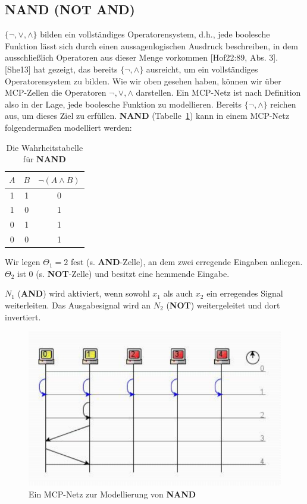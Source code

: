 {\subsection*{NAND (NOT AND)}

$\{\neg, \lor, \land\}$ bilden ein vollständiges Operatorensystem, d.h., jede boolesche Funktion lässt sich durch einen aussagenlogischen Ausdruck  beschreiben, in dem ausschließlich Operatoren aus dieser Menge vorkommen [Hof22:89, Abs. 3].
[She13] hat gezeigt, das bereits $\{\neg, \land\}$  ausreicht, um ein vollständiges Operatorensystem zu bilden.
Wie wir oben gesehen haben, können wir über MCP-Zellen die Operatoren $\neg, \lor, \land$ darstellen.
Ein MCP-Netz ist nach Definition also in der Lage, jede boolesche Funktion zu modellieren.
Bereits $\{\neg, \land\}$ reichen aus, um dieses Ziel zu erfüllen. \textbf{NAND} (Tabelle~\ref{tab:nand}) kann in einem MCP-Netz folgendermaßen modelliert werden:

\begin{table} %
    \centering
    \begin{tabular}{c | c | c}
        $A$ & $B$ & $\neg(A \land B)$ \\
        \hline
        1   & 1   & 0           \\
        1   & 0   & 1           \\
        0   & 1   & 1           \\
        0   & 0   & 1           \\
    \end{tabular}
    \caption{Die Wahrheitstabelle für \textbf{NAND}}
    \label{tab:nand}
\end{table}


Wir legen $\Theta_1 = 2$ fest (s. \textbf{AND}-Zelle), an dem zwei erregende Eingaben anliegen. $\Theta_2$ ist $0$ (s. \textbf{NOT}-Zelle) und besitzt eine hemmende Eingabe.

$N_1$ (\textbf{AND}) wird aktiviert, wenn sowohl $x_1$ als auch $x_2$ ein erregendes Signal weiterleiten. Das Ausgabesignal wird an $N_2$ (\textbf{NOT}) weitergeleitet und dort invertiert.


\begin{figure}[h]
    \centering
    \includegraphics{images/p1ReadSeq.pdf}
    \caption{Ein MCP-Netz zur Modellierung von \textbf{NAND}}
    \label{fig-mcpnand}
\end{figure}


}
